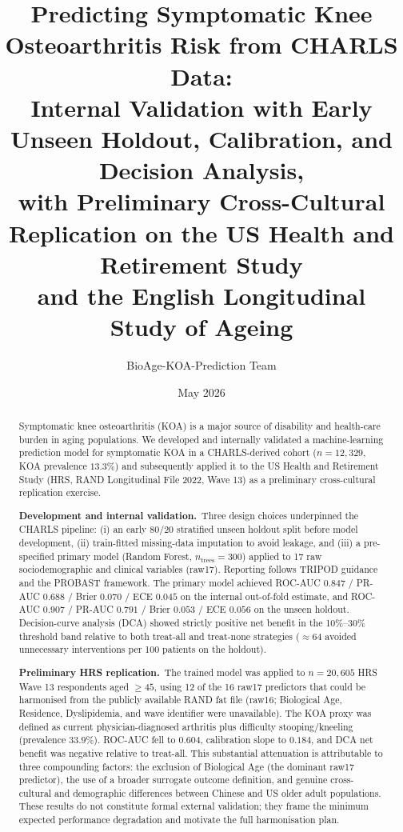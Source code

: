 \documentclass[11pt,a4paper]{article}
\title{Predicting Symptomatic Knee Osteoarthritis Risk from CHARLS Data:\\
\large Internal Validation with Early Unseen Holdout, Calibration, and Decision Analysis,\\
with Preliminary Cross-Cultural Replication on the US Health and Retirement Study\\
and the English Longitudinal Study of Ageing}
\author{BioAge-KOA-Prediction Team}
\date{May 2026}
\begin{document}
\maketitle

\begin{abstract}
Symptomatic knee osteoarthritis (KOA) is a major source of disability and health-care burden in aging
populations. We developed and internally validated a machine-learning prediction model for symptomatic KOA
in a CHARLS-derived cohort ($n=12{,}329$, KOA prevalence $13.3\%$) and subsequently applied it to the US
Health and Retirement Study (HRS, RAND Longitudinal File 2022, Wave 13) as a preliminary cross-cultural
replication exercise.

\textbf{Development and internal validation.}\ Three design choices underpinned the CHARLS pipeline:
(i) an early 80/20 stratified unseen holdout split before model development,
(ii) train-fitted missing-data imputation to avoid leakage, and
(iii) a pre-specified primary model (Random Forest, $n_{\text{trees}}=300$) applied to 17 raw
sociodemographic and clinical variables (raw17). Reporting follows TRIPOD guidance and the PROBAST
framework. The primary model achieved ROC-AUC $0.847$ / PR-AUC $0.688$ / Brier $0.070$ / ECE $0.045$
on the internal out-of-fold estimate, and ROC-AUC $0.907$ / PR-AUC $0.791$ / Brier $0.053$ / ECE $0.056$
on the unseen holdout. Decision-curve analysis (DCA) showed strictly positive net benefit in the
10\%--30\% threshold band relative to both treat-all and treat-none strategies
(${\approx}64$ avoided unnecessary interventions per 100 patients on the holdout).

\textbf{Preliminary HRS replication.}\ The trained model was applied to $n=20{,}605$ HRS Wave 13
respondents aged $\geq 45$, using 12 of the 16 raw17 predictors that could be harmonised from the
publicly available RAND fat file (raw16; Biological Age, Residence, Dyslipidemia, and wave identifier
were unavailable). The KOA proxy was defined as current physician-diagnosed arthritis plus difficulty
stooping/kneeling (prevalence $33.9\%$). ROC-AUC fell to $0.604$, calibration slope to $0.184$, and DCA
net benefit was negative relative to treat-all. This substantial attenuation is attributable to three
compounding factors: the exclusion of Biological Age (the dominant raw17 predictor), the use of a
broader surrogate outcome definition, and genuine cross-cultural and demographic differences between
Chinese and US older adult populations. These results do not constitute formal external validation; they
frame the minimum expected performance degradation and motivate the full harmonisation plan.


\end{abstract}
\end{document}
